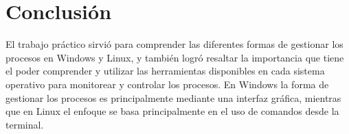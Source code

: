 \documentclass[12pt]{article}
\begin{document}
  \section{Conclusión}
  El trabajo práctico sirvió para comprender las diferentes formas de gestionar los procesos en Windows y Linux, y también logró resaltar la importancia que tiene el poder comprender y utilizar las herramientas disponibles en cada sistema operativo para monitorear y controlar los procesos. En Windows la forma de gestionar los procesos es principalmente mediante una interfaz gráfica, mientras que en Linux el enfoque se basa principalmente en el uso de comandos desde la terminal.

\end{document}
